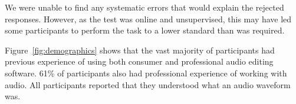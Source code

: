 We were unable to find any systematic errors that would explain the rejected responses. However, as the test was online
and unsupervised, this may have led some participants to perform the task to a lower standard than was required.

Figure~\ref{fig:demographics} shows that the vast majority of participants had previous experience of using both
consumer and professional audio editing software. 61\% of participants also had professional experience of working with
audio. All participants reported that they understood what an audio waveform was.






